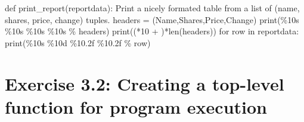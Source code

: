 \documentclass[
  letterpaper,
  DIV=11,
  numbers=noendperiod]{scrreprt}
\newenvironment{Shaded}{\begin{snugshade}}{\end{snugshade}}
\newcommand{\BuiltInTok}[1]{\textcolor[rgb]{0.00,0.46,0.62}{#1}}
\newcommand{\CommentTok}[1]{\textcolor[rgb]{0.37,0.37,0.37}{#1}}
\newcommand{\ControlFlowTok}[1]{\textcolor[rgb]{0.00,0.46,0.62}{#1}}
\newcommand{\DecValTok}[1]{\textcolor[rgb]{0.68,0.00,0.00}{#1}}
\newcommand{\KeywordTok}[1]{\textcolor[rgb]{0.00,0.46,0.62}{#1}}
\newcommand{\NormalTok}[1]{\textcolor[rgb]{0.00,0.46,0.62}{#1}}
\newcommand{\OperatorTok}[1]{\textcolor[rgb]{0.37,0.37,0.37}{#1}}
\newcommand{\SpecialCharTok}[1]{\textcolor[rgb]{0.37,0.37,0.37}{#1}}
\newcommand{\StringTok}[1]{\textcolor[rgb]{0.13,0.47,0.30}{#1}}
\begin{document}
\begin{Shaded}
\begin{Highlighting}[]
\KeywordTok{def}\NormalTok{ print\_report(reportdata):}
    \CommentTok{\textquotesingle{}\textquotesingle{}\textquotesingle{}}
\CommentTok{    Print a nicely formated table from a list of (name, shares, price, change) tuples.}
\CommentTok{    \textquotesingle{}\textquotesingle{}\textquotesingle{}}
\NormalTok{    headers }\OperatorTok{=}\NormalTok{ (}\StringTok{\textquotesingle{}Name\textquotesingle{}}\NormalTok{,}\StringTok{\textquotesingle{}Shares\textquotesingle{}}\NormalTok{,}\StringTok{\textquotesingle{}Price\textquotesingle{}}\NormalTok{,}\StringTok{\textquotesingle{}Change\textquotesingle{}}\NormalTok{)}
    \BuiltInTok{print}\NormalTok{(}\StringTok{\textquotesingle{}}\SpecialCharTok{\%10s}\StringTok{ }\SpecialCharTok{\%10s}\StringTok{ }\SpecialCharTok{\%10s}\StringTok{ }\SpecialCharTok{\%10s}\StringTok{\textquotesingle{}} \OperatorTok{\%}\NormalTok{ headers)}
    \BuiltInTok{print}\NormalTok{((}\StringTok{\textquotesingle{}{-}\textquotesingle{}}\OperatorTok{*}\DecValTok{10} \OperatorTok{+} \StringTok{\textquotesingle{} \textquotesingle{}}\NormalTok{)}\OperatorTok{*}\BuiltInTok{len}\NormalTok{(headers))}
    \ControlFlowTok{for}\NormalTok{ row }\KeywordTok{in}\NormalTok{ reportdata:}
        \BuiltInTok{print}\NormalTok{(}\StringTok{\textquotesingle{}}\SpecialCharTok{\%10s}\StringTok{ }\SpecialCharTok{\%10d}\StringTok{ }\SpecialCharTok{\%10.2f}\StringTok{ }\SpecialCharTok{\%10.2f}\StringTok{\textquotesingle{}} \OperatorTok{\%}\NormalTok{ row)}
\end{Highlighting}
\end{Shaded}

\hypertarget{exercise-3.2-creating-a-top-level-function-for-program-execution}{%
\section{Exercise 3.2: Creating a top-level function for program
execution}\label{exercise-3.2-creating-a-top-level-function-for-program-execution}}
\end{document}
